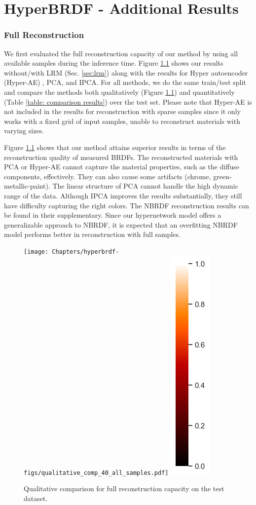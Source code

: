 \chapter{HyperBRDF - Additional Results}
\label{hyperbrdf:add_res}

\subsection{Full Reconstruction}\label{sec:full_rec}

We first evaluated the full reconstruction capacity of our method by using all available samples during the inference time. Figure \ref{fig:qual_comp} shows our results without/with LRM (Sec. \ref{sec:lrm}) along with the results for Hyper autoencoder (Hyper-AE) \cite{sztrajman2021neural}, PCA, and IPCA. For all methods, we do the same train/test split and compare the methods both qualitatively (Figure \ref{fig:qual_comp}) and quantitatively (Table \ref{table: comparison results}) over the test set. Please note that Hyper-AE is not included in the results for reconstruction with sparse samples since it only works with a fixed grid of input samples, unable to reconstruct materials with varying sizes. 


Figure \ref{fig:qual_comp} shows that our method attains superior results in terms of the reconstruction quality of measured BRDFs. The reconstructed materials with PCA or Hyper-AE cannot capture the material properties, such as the diffuse components, effectively. They can also cause some artifacts (chrome, green-metallic-paint). The linear structure of PCA cannot handle the high dynamic range of the data. Although IPCA \cite{nielsen2015optimal} improves the results substantially, they still have difficulty capturing the right colors. The NBRDF \cite{sztrajman2021neural} reconstruction results can be found in their supplementary. Since our hypernetwork model offers a generalizable approach to NBRDF, it is expected that an overfitting NBRDF model performs better in reconstruction with full samples. 

\begin{figure}
  \centering
{}%
  {\texttt{[image: Chapters/hyperbrdf-figs/qualitative\_comp\_40\_all\_samples.pdf]}}
    \includegraphics[width=0.02\linewidth]{Chapters/hyperbrdf-figs/vbar.png}

   \caption{Qualitative comparison for full reconstruction capacity on the test dataset.}

   \label{fig:qual_comp}
\end{figure}

